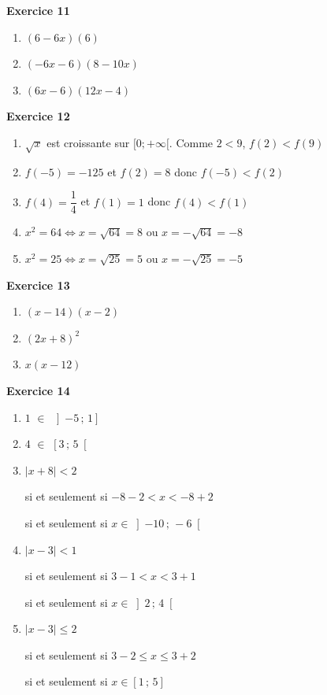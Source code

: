 \documentclass[12pt,a4paper,french]{article}
\begin{document}
\noindent\textbf{Exercice 11}\par
\smallskip
\begin{enumerate}
\item $(6 - 6x)(6)$
\item $(-6x - 6)(8 - 10x)$
\item $(6x - 6)(12x - 4)$
\end{enumerate}
\medskip

\noindent\textbf{Exercice 12}\par
\smallskip
\begin{enumerate}
\item $\sqrt{x}$ est croissante sur $[0;+\infty[$. Comme $2 < 9$, $f(2) < f(9)$
\item $f(-5) = -125$ et $f(2) = 8$ donc $f(-5) < f(2)$
\item $f(4) = \dfrac{1}{4}$ et $f(1) = 1$ donc $f(4) < f(1)$
\item $x^2 = 64 \Longleftrightarrow x = \sqrt{64} = 8$ ou $x = -\sqrt{64} = -8$
\item $x^2 = 25 \Longleftrightarrow x = \sqrt{25} = 5$ ou $x = -\sqrt{25} = -5$
\end{enumerate}
\medskip

\noindent\textbf{Exercice 13}\par
\smallskip
\begin{enumerate}
\item $(x - 14)(x - 2)$
\item $(2x + 8)^2$
\item $x(x - 12)$
\end{enumerate}
\medskip

\noindent\textbf{Exercice 14}\par
\smallskip
\begin{enumerate}
\item $1$ $\in$ $\left] -5 \,;\, 1 \right]$
\item $4$ $\in$ $\left[ 3 \,;\, 5 \right[$
\item $|x + 8| < 2$

si et seulement si $-8 - 2 < x < -8 + 2$

si et seulement si $x \in \left] -10 \,;\, -6 \right[$
\item $|x - 3| < 1$

si et seulement si $3 - 1 < x < 3 + 1$

si et seulement si $x \in \left] 2 \,;\, 4 \right[$
\item $|x - 3| \leqslant 2$

si et seulement si $3 - 2 \leq x \leq 3 + 2$

si et seulement si $x \in \left[ 1 \,;\, 5 \right]$
\end{enumerate}
\medskip
\end{document}
